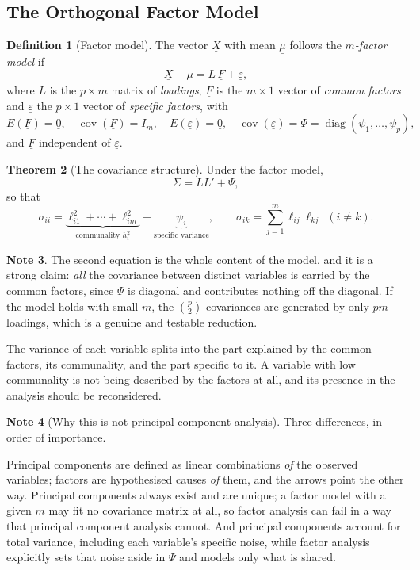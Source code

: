 \documentclass[11pt,a4paper]{article}
\theoremstyle{definition}
\newtheorem{thm}{Theorem}[section]
\newtheorem{defn}[thm]{Definition}
\newtheorem{note}[thm]{Note}
\begin{document}
\subsection{The Orthogonal Factor Model}

\begin{defn}[Factor model]
The vector $\underline{X}$ with mean $\underline{\mu}$ follows the
\emph{$m$-factor model} if
$$\underline{X}-\underline{\mu} = L\,\underline{F} + \underline{\varepsilon},$$
where $L$ is the $p\times m$ matrix of \emph{loadings}, $\underline{F}$ is the
$m\times1$ vector of \emph{common factors} and $\underline{\varepsilon}$ the
$p\times1$ vector of \emph{specific factors}, with
$$E(\underline{F}) = \underline{0},\quad
\operatorname{cov}(\underline{F}) = I_m,\quad
E(\underline{\varepsilon}) = \underline{0},\quad
\operatorname{cov}(\underline{\varepsilon}) = \Psi
= \operatorname{diag}(\psi_1,\dots,\psi_p),$$
and $\underline{F}$ independent of $\underline{\varepsilon}$.
\end{defn}

\begin{thm}[The covariance structure]
\label{thm:factorcov}
Under the factor model,
$$\Sigma = LL' + \Psi,$$
so that
$$\sigma_{ii} = \underbrace{\ell_{i1}^{2}+\cdots+\ell_{im}^{2}}_{\text{communality } h_i^{2}}
+ \underbrace{\psi_i}_{\text{specific variance}},
\qquad
\sigma_{ik} = \sum^{m}_{j=1}\ell_{ij}\ell_{kj} \ \ (i\neq k).$$
\end{thm}

\begin{note}
The second equation is the whole content of the model, and it is a strong
claim: \emph{all} the covariance between distinct variables is carried by the
common factors, since $\Psi$ is diagonal and contributes nothing off the
diagonal. If the model holds with small $m$, the $\binom{p}{2}$ covariances are
generated by only $pm$ loadings, which is a genuine and testable reduction.

The variance of each variable splits into the part explained by the common
factors, its communality, and the part specific to it. A variable with low
communality is not being described by the factors at all, and its presence in
the analysis should be reconsidered.
\end{note}

\begin{note}[Why this is not principal component analysis]
Three differences, in order of importance.

Principal components are defined as linear combinations \emph{of} the observed
variables; factors are hypothesised causes \emph{of} them, and the arrows point
the other way. Principal components always exist and are unique; a factor model
with a given $m$ may fit no covariance matrix at all, so factor analysis can
fail in a way that principal component analysis cannot. And principal components
account for total variance, including each variable's specific noise, while
factor analysis explicitly sets that noise aside in $\Psi$ and models only what
is shared.
\end{note}
\end{document}

